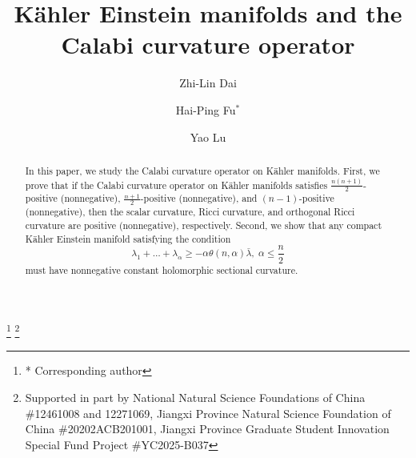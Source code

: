 \documentclass{amsart}
\theoremstyle{definition}
\theoremstyle{remark}
\numberwithin{equation}{section}
\begin{document}
\title{K{\"a}hler Einstein manifolds and the Calabi curvature operator}


\author{Zhi-Lin Dai}
\address{School of Science, East China University of Technology, Fuzhou, 344000, Jiangxi, China}

\author{Hai-Ping Fu$^*$}
\address{Department of Mathematics,  Nanchang University, Nanchang 330031, P. R. China}
\thanks{* Corresponding author}
\thanks{Supported in part by National Natural Science Foundations of China \#12461008 and 12271069, Jiangxi
Province Natural Science Foundation of China \#20202ACB201001, Jiangxi Province Graduate Student Innovation Special Fund Project \#YC2025-B037}

\author{Yao Lu}
\address{Department of Mathematics,  Nanchang University, Nanchang 330031, P. R. China}




\begin{abstract}
In this paper, we study the Calabi curvature operator on K{\"a}hler manifolds. First, we prove that if the Calabi curvature operator on K{\"a}hler manifolds satisfies $\frac{{n\left(n + 1\right)}}{2}$-positive (nonnegative), $\frac{{n + 1}}{2}$-positive (nonnegative), and $\left( n-1 \right)$-positive (nonnegative), then the scalar curvature, Ricci curvature, and orthogonal Ricci curvature are positive (nonnegative), respectively. Second, we show that any compact K{\"a}hler Einstein manifold satisfying the condition
$$\lambda_1+\dots+\lambda_{\alpha}\ge -{\alpha}\theta(n,{\alpha})\bar\lambda,\; {\alpha}\le \frac{n}{2}$$
must have nonnegative constant holomorphic sectional curvature.
\end{abstract}

\maketitle
\end{document}
